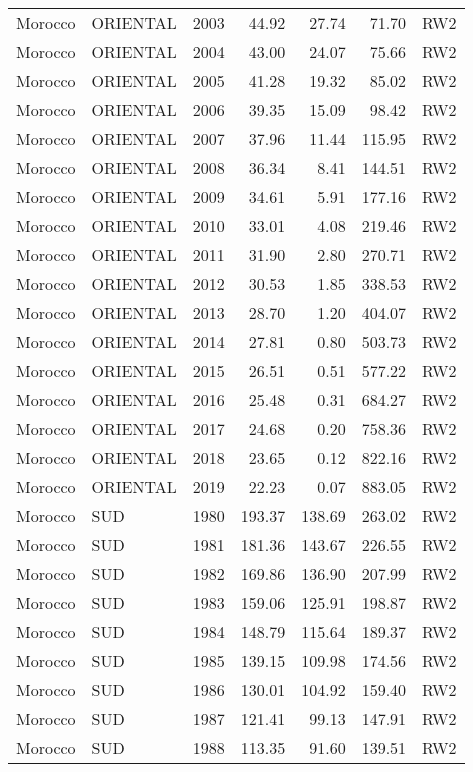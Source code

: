 \begin{longtable}{lllrrrl}
  Morocco & ORIENTAL & 2003 & 44.92 & 27.74 & 71.70 & RW2 \\ 
  Morocco & ORIENTAL & 2004 & 43.00 & 24.07 & 75.66 & RW2 \\ 
  Morocco & ORIENTAL & 2005 & 41.28 & 19.32 & 85.02 & RW2 \\ 
  Morocco & ORIENTAL & 2006 & 39.35 & 15.09 & 98.42 & RW2 \\ 
  Morocco & ORIENTAL & 2007 & 37.96 & 11.44 & 115.95 & RW2 \\ 
  Morocco & ORIENTAL & 2008 & 36.34 & 8.41 & 144.51 & RW2 \\ 
  Morocco & ORIENTAL & 2009 & 34.61 & 5.91 & 177.16 & RW2 \\ 
  Morocco & ORIENTAL & 2010 & 33.01 & 4.08 & 219.46 & RW2 \\ 
  Morocco & ORIENTAL & 2011 & 31.90 & 2.80 & 270.71 & RW2 \\ 
  Morocco & ORIENTAL & 2012 & 30.53 & 1.85 & 338.53 & RW2 \\ 
  Morocco & ORIENTAL & 2013 & 28.70 & 1.20 & 404.07 & RW2 \\ 
  Morocco & ORIENTAL & 2014 & 27.81 & 0.80 & 503.73 & RW2 \\ 
  Morocco & ORIENTAL & 2015 & 26.51 & 0.51 & 577.22 & RW2 \\ 
  Morocco & ORIENTAL & 2016 & 25.48 & 0.31 & 684.27 & RW2 \\ 
  Morocco & ORIENTAL & 2017 & 24.68 & 0.20 & 758.36 & RW2 \\ 
  Morocco & ORIENTAL & 2018 & 23.65 & 0.12 & 822.16 & RW2 \\ 
  Morocco & ORIENTAL & 2019 & 22.23 & 0.07 & 883.05 & RW2 \\ 
  Morocco & SUD & 1980 & 193.37 & 138.69 & 263.02 & RW2 \\ 
  Morocco & SUD & 1981 & 181.36 & 143.67 & 226.55 & RW2 \\ 
  Morocco & SUD & 1982 & 169.86 & 136.90 & 207.99 & RW2 \\ 
  Morocco & SUD & 1983 & 159.06 & 125.91 & 198.87 & RW2 \\ 
  Morocco & SUD & 1984 & 148.79 & 115.64 & 189.37 & RW2 \\ 
  Morocco & SUD & 1985 & 139.15 & 109.98 & 174.56 & RW2 \\ 
  Morocco & SUD & 1986 & 130.01 & 104.92 & 159.40 & RW2 \\ 
  Morocco & SUD & 1987 & 121.41 & 99.13 & 147.91 & RW2 \\ 
  Morocco & SUD & 1988 & 113.35 & 91.60 & 139.51 & RW2 \\ 

\end{longtable}
